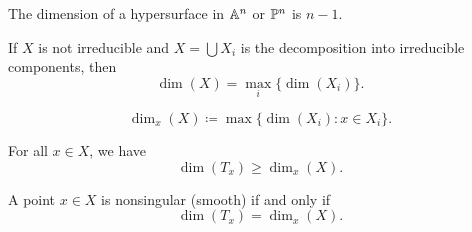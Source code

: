 \begin{lemma*}{
    The dimension of a hypersurface in $\aa^n$ or $\pp^n$ is $n - 1$.
}
\end{lemma*}

\begin{corollary*}{
    If $X$ is not irreducible and $X = \bigcup X_i$ is the decomposition into irreducible components, then
    \[
        \dim(X) = \max_i \{\dim(X_i)\}.
    \]
}
\end{corollary*}

\begin{definition}
    \[
        \dim_x(X) \coloneqq \max \{ \dim(X_i) : x \in X_i \}.
    \]
\end{definition}

\begin{theorem*}{
    For all $x \in X$, we have
    \[
        \dim(T_x) \ge \dim_x(X).
    \]
}
\end{theorem*}

\begin{definition}{
    A point $x \in X$ is nonsingular (smooth) if and only if
    \[
        \dim(T_x) = \dim_x(X).
    \]
}
\end{definition}
